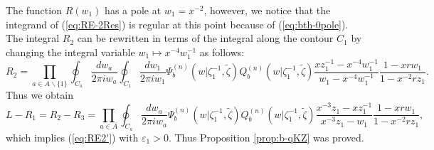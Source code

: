 \documentclass[a4paper,10pt]{article}
\begin{document}
{The function $R(w_1 )$ has a pole at $w_1 =x^{-2}$, 
however, we notice that the integrand of 
(\ref{eq:RE-2Res}) is regular at this point because 
of (\ref{eq:bth-0pole}). 
The integral $R_2$ can be rewritten in terms of the 
integral along the contour $C_1$ by changing the integral 
variable $w_1 \mapsto x^{-4}w_1^{-1}$ as follows: 
$$
R_2 =\prod_{a\in A\backslash\{ 1\}}\oint_{C_a} 
\dfrac{dw_a}{2\pi iw_a} 
\oint_{C_1} 
\dfrac{dw_1}{2\pi iw_1} 
\Psi_{b}^{(n)} (w|\zeta_1^{-1},\tilde{\zeta})
Q_b^{(n)}(w|\zeta_1^{-1},\tilde{\zeta})
\frac{xz_{1}^{-1}-x^{-4}w_1^{-1}}{w_1 -x^{-4}w_1^{-1}}
\frac{1-xrw_1}{1-x^{-2}rz_1}. 
$$
Thus we obtain 
$$
L-R_1 =R_2 -R_3 =
\prod_{a\in A}\oint_{C_a} \dfrac{dw_a}{2\pi iw_a} 
\Psi_{b}^{(n)} (w|\zeta_1^{-1},\tilde{\zeta})
Q_b^{(n)}(w|\zeta_1^{-1},\tilde{\zeta})
\frac{x^{-3}z_{1}-xz_1^{-1}}{x^{-3}z_{1}-w_1}
\frac{1-xrw_1}{1-x^{-2}rz_1}, 
$$
which implies (\ref{eq:RE2'}) with $\varepsilon_{1}>0$. 
Thus Proposition \ref{prop:b-qKZ} was proved. 

}
\end{document}
